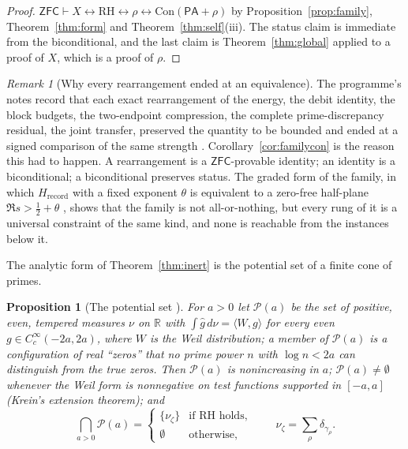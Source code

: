 \documentclass[11pt]{article}
\newtheorem{proposition}[theorem]{Proposition}
\theoremstyle{definition}
\theoremstyle{remark}
\newtheorem{remark}[theorem]{Remark}
\newcommand{\PA}{\mathsf{PA}}
\newcommand{\ZFC}{\mathsf{ZFC}}
\newcommand{\Con}{\mathrm{Con}}
\newcommand{\RH}{\mathrm{RH}}
\begin{document}
\begin{proof}
$\ZFC\vdash X\leftrightarrow\RH\leftrightarrow\rho\leftrightarrow\Con(\PA+\rho)$ by Proposition~\ref{prop:family}, Theorem~\ref{thm:form} and Theorem~\ref{thm:self}(iii). The status claim is immediate from the biconditional, and the last claim is Theorem~\ref{thm:global} applied to a proof of $X$, which is a proof of $\rho$.
\end{proof}

\begin{remark}[Why every rearrangement ended at an equivalence]
The programme's notes record that each exact rearrangement of the energy, the debit identity, the block budgets, the two-endpoint compression, the complete prime-discrepancy residual, the joint transfer, preserved the quantity to be bounded and ended at a signed comparison of the same strength \cite{Hrec,CensusAudit}. Corollary~\ref{cor:familycon} is the reason this had to happen. A rearrangement is a $\ZFC$-provable identity; an identity is a biconditional; a biconditional preserves status. The graded form of the family, in which $H_{\mathrm{record}}$ with a fixed exponent $\theta$ is equivalent to a zero-free half-plane $\Re s>\tfrac12+\theta$ \cite[Theorem 3.2]{Hrec}, shows that the family is not all-or-nothing, but every rung of it is a universal constraint of the same kind, and none is reachable from the instances below it.
\end{remark}

The analytic form of Theorem~\ref{thm:inert} is the potential set of a finite cone of primes.

\begin{proposition}[The potential set \cite{Potential}]\label{prop:potential}
For $a>0$ let $\mathcal P(a)$ be the set of positive, even, tempered measures $\nu$ on $\mathbb R$ with $\int\widehat g\,d\nu=\langle W,g\rangle$ for every even $g\in C_c^\infty(-2a,2a)$, where $W$ is the Weil distribution; a member of $\mathcal P(a)$ is a configuration of real ``zeros'' that no prime power $n$ with $\log n<2a$ can distinguish from the true zeros. Then $\mathcal P(a)$ is nonincreasing in $a$; $\mathcal P(a)\ne\emptyset$ whenever the Weil form is nonnegative on test functions supported in $[-a,a]$ (Krein's extension theorem); and
\[
\bigcap_{a>0}\mathcal P(a)=\begin{cases}\{\nu_\zeta\}&\text{if }\RH\text{ holds},\\ \emptyset&\text{otherwise,}\end{cases}
\qquad \nu_\zeta=\sum_\rho\delta_{\gamma_\rho}.
\]
\end{proposition}
\end{document}

